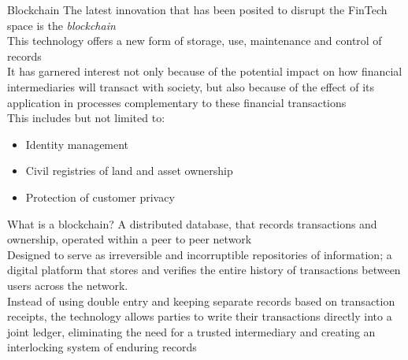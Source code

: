 \documentclass[10pt]{beamer}
\begin{document}
\begin{frame}{Blockchain}
	The latest innovation that has been posited to disrupt the FinTech space is the \textit{blockchain} \\\vspace{3mm}
	This technology offers a new form of storage, use, maintenance and control of records \\\vspace{3mm}
	It has garnered interest not only because of the potential impact on how financial intermediaries will transact with society, but also because of the effect of its application in processes complementary to these financial transactions\\\vspace{3mm}
	This includes but not limited to:
	\begin{itemize}
		\item Identity management
		\item Civil registries of land and asset ownership
		\item Protection of customer privacy
	\end{itemize}
\end{frame}


\begin{frame}{What is a blockchain?}
	A distributed database, that records transactions and ownership, operated within a peer to peer network\\ \vspace{3mm}
	Designed to serve as irreversible and incorruptible repositories of information; a digital platform that stores and verifies the entire history of transactions between users across the network. \\ \vspace{3mm}
	Instead of using double entry and keeping separate records based on transaction receipts, the technology allows parties to write their transactions directly into a joint ledger, eliminating the need for a trusted intermediary and creating an interlocking system of enduring records \\ \vspace{3mm}
\end{frame}

\end{document}
